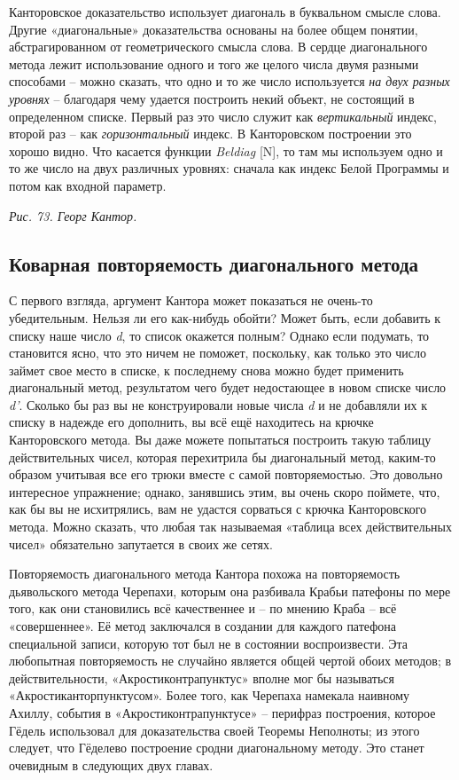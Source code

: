 \documentclass[../main.tex]{subfiles}
\begin{document}
Канторовское доказательство использует диагональ в буквальном смысле слова. Другие «диагональные» доказательства основаны на более общем понятии, абстрагированном от геометрического смысла слова. В сердце диагонального метода лежит использование одного и того же целого числа двумя разными способами \--- можно сказать, что одно и то же число используется \emph{на двух разных уровнях} \--- благодаря чему удается построить некий объект, не состоящий в определенном списке. Первый раз это число служит как \emph{вертикальный} индекс, второй раз \--- как \emph{горизонтальный} индекс. В Канторовском построении это хорошо видно. Что касается функции \emph{Beldiag} {[}N{]}, то там мы используем одно и то же число на двух различных уровнях: сначала как индекс Белой Программы и потом как входной параметр.

\emph{Рис. 73. Георг Кантор.}


\subsection{Коварная повторяемость диагонального метода}

С первого взгляда, аргумент Кантора может показаться не очень-то убедительным. Нельзя ли его как-нибудь обойти? Может быть, если добавить к списку наше число \emph{d}, то список окажется полным? Однако если подумать, то становится ясно, что это ничем не поможет, поскольку, как только это число займет свое место в списке, к последнему снова можно будет применить диагональный метод, результатом чего будет недостающее в новом списке число \emph{d'}. Сколько бы раз вы не конструировали новые числа \emph{d} и не добавляли их к списку в надежде его дополнить, вы всё ещё находитесь на крючке Канторовского метода. Вы даже можете попытаться построить такую таблицу действительных чисел, которая перехитрила бы диагональный метод, каким-то образом учитывая все его трюки вместе с самой повторяемостью. Это довольно интересное упражнение; однако, занявшись этим, вы очень скоро поймете, что, как бы вы не исхитрялись, вам не удастся сорваться с крючка Канторовского метода. Можно сказать, что любая так называемая «таблица всех действительных чисел» обязательно запутается в своих же сетях.

Повторяемость диагонального метода Кантора похожа на повторяемость дьявольского метода Черепахи, которым она разбивала Крабьи патефоны по мере того, как они становились всё качественнее и \--- по мнению Краба \--- всё «совершеннее». Её метод заключался в создании для каждого патефона специальной записи, которую тот был не в состоянии воспроизвести. Эта любопытная повторяемость не случайно является общей чертой обоих методов; в действительности, «Акростиконтрапунктус» вполне мог бы называться «Акростиканторпунктусом». Более того, как Черепаха намекала наивному Ахиллу, события в «Акростиконтрапунктусе» \--- перифраз построения, которое Гёдель использовал для доказательства своей Теоремы Неполноты; из этого следует, что Гёделево построение сродни диагональному методу. Это станет очевидным в следующих двух главах.
\end{document}
